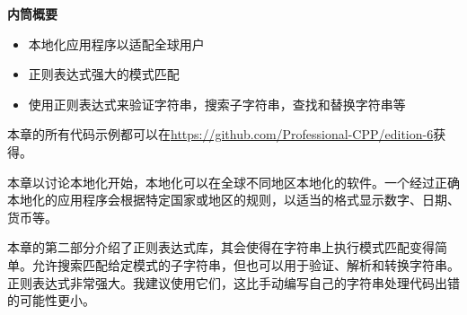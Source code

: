 \noindent
\textbf{内筒概要}

\begin{itemize}
\item
本地化应用程序以适配全球用户

\item
正则表达式强大的模式匹配

\item
使用正则表达式来验证字符串，搜索子字符串，查找和替换字符串等
\end{itemize}

本章的所有代码示例都可以在\url{https://github.com/Professional-CPP/edition-6}获得。

本章以讨论本地化开始，本地化可以在全球不同地区本地化的软件。一个经过正确本地化的应用程序会根据特定国家或地区的规则，以适当的格式显示数字、日期、货币等。

本章的第二部分介绍了正则表达式库，其会使得在字符串上执行模式匹配变得简单。允许搜索匹配给定模式的子字符串，但也可以用于验证、解析和转换字符串。正则表达式非常强大。我建议使用它们，这比手动编写自己的字符串处理代码出错的可能性更小。
